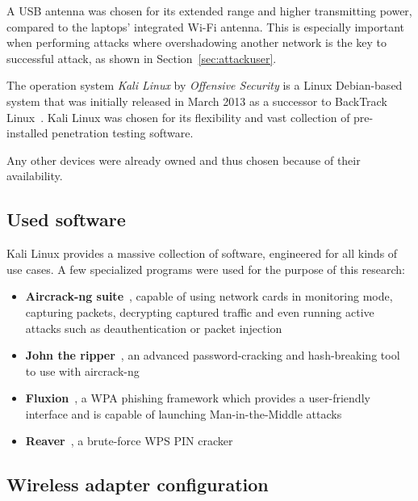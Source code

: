 A USB antenna was chosen for its extended range and higher transmitting power, compared to the laptops' integrated Wi-Fi antenna. This is especially important when performing attacks where overshadowing another network is the key to successful attack, as shown in Section~\ref{sec:attackuser}.

The operation system \emph{Kali Linux} by \emph{Offensive Security} is a Linux Debian-based system that was initially released in March 2013 as a successor to BackTrack Linux~\cite{OffSecDoc17}. Kali Linux was chosen for its flexibility and vast collection of pre-installed penetration testing software.

Any other devices were already owned and thus chosen because of their availability.

\subsection{Used software}

Kali Linux provides a massive collection of software, engineered for all kinds of use cases. A few specialized programs were used for the purpose of this research:

\begin{itemize}

\item{\textbf{Aircrack-ng suite}~\cite{AirNg17}, capable of using network cards in monitoring mode, capturing packets, decrypting captured traffic and even running active attacks such as deauthentication or packet injection}

\item{\textbf{John the ripper}~\cite{Openwall17}, an advanced password-cracking and hash-breaking tool to use with aircrack-ng}

\item{\textbf{Fluxion}~\cite{Fluxion17}, a WPA phishing framework which provides a user-friendly interface and is capable of launching Man-in-the-Middle attacks}

\item{\textbf{Reaver}~\cite{Reaver17}, a brute-force WPS PIN cracker}

\end{itemize}

\subsection{Wireless adapter configuration}\label{sec:wificonf}

